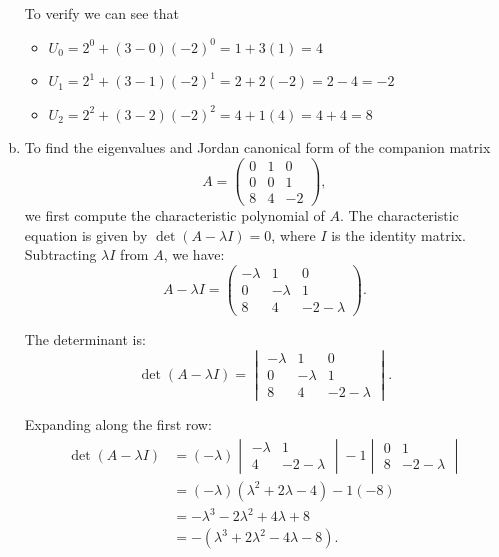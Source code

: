 \documentclass{article}
\begin{document}
\begin{enumerate}[(a)]
            To verify we can see that
            \begin{itemize}
                \item $U_0 = 2^0 + (3 - 0)(-2)^0 = 1 + 3(1) = 4$
                \item $U_1 = 2^1 + (3 - 1)(-2)^1 = 2 + 2(-2) = 2 - 4 = -2$
                \item $U_2 = 2^2 + (3 - 2)(-2)^2 = 4 + 1(4) = 4 + 4 = 8$
            \end{itemize}
            \item To find the eigenvalues and Jordan canonical form of the companion matrix 
            \[
            A = \begin{pmatrix}
            0 & 1 & 0 \\
            0 & 0 & 1 \\
            8 & 4 & -2
            \end{pmatrix},
            \]
            we first compute the characteristic polynomial of $A$. The characteristic equation is given by $\det(A - \lambda I) = 0$, where $I$ is the identity matrix. Subtracting $\lambda I$ from $A$, we have:
            \[
            A - \lambda I = \begin{pmatrix}
            -\lambda & 1 & 0 \\
            0 & -\lambda & 1 \\
            8 & 4 & -2 - \lambda
            \end{pmatrix}.
            \]

            The determinant is:
            \[
            \det(A - \lambda I) = \begin{vmatrix}
            -\lambda & 1 & 0 \\
            0 & -\lambda & 1 \\
            8 & 4 & -2 - \lambda
            \end{vmatrix}.
            \]

            Expanding along the first row:
            \begin{align*}
                \det(A - \lambda I) &= (-\lambda) \begin{vmatrix}
                -\lambda & 1 \\
                4 & -2 - \lambda
                \end{vmatrix} - 1 \begin{vmatrix}
                0 & 1 \\
                8 & -2 - \lambda
                \end{vmatrix} \\
                &= (-\lambda)(\lambda^2 + 2\lambda - 4) - 1(-8) \\
                &= -\lambda^3 - 2\lambda^2 + 4\lambda + 8 \\
                &= -(\lambda^3 + 2\lambda^2 - 4\lambda - 8).
            \end{align*}


\end{enumerate}
\end{document}
